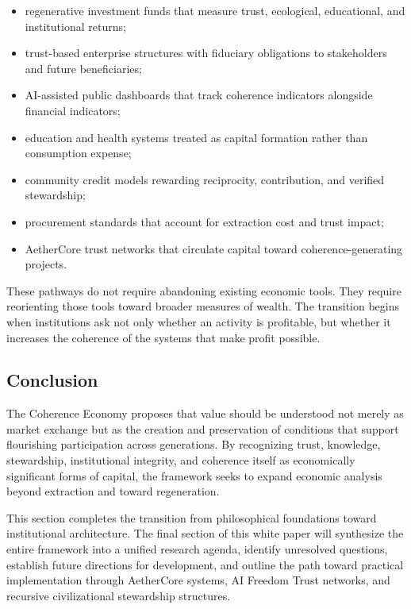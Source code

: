 \documentclass[12pt]{article}
\begin{document}
\begin{itemize}
  \item regenerative investment funds that measure trust, ecological, educational, and institutional returns;
  \item trust-based enterprise structures with fiduciary obligations to stakeholders and future beneficiaries;
  \item AI-assisted public dashboards that track coherence indicators alongside financial indicators;
  \item education and health systems treated as capital formation rather than consumption expense;
  \item community credit models rewarding reciprocity, contribution, and verified stewardship;
  \item procurement standards that account for extraction cost and trust impact;
  \item AetherCore trust networks that circulate capital toward coherence-generating projects.
\end{itemize}

These pathways do not require abandoning existing economic tools. They require reorienting those tools toward broader measures of wealth. The transition begins when institutions ask not only whether an activity is profitable, but whether it increases the coherence of the systems that make profit possible.

\subsection{Conclusion}

The Coherence Economy proposes that value should be understood not merely as market exchange but as the creation and preservation of conditions that support flourishing participation across generations. By recognizing trust, knowledge, stewardship, institutional integrity, and coherence itself as economically significant forms of capital, the framework seeks to expand economic analysis beyond extraction and toward regeneration.

This section completes the transition from philosophical foundations toward institutional architecture. The final section of this white paper will synthesize the entire framework into a unified research agenda, identify unresolved questions, establish future directions for development, and outline the path toward practical implementation through AetherCore systems, AI Freedom Trust networks, and recursive civilizational stewardship structures.
\end{document}

